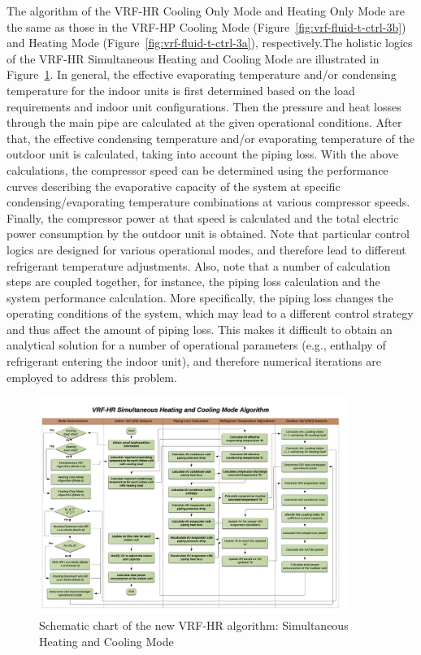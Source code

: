The algorithm of the VRF-HR Cooling Only Mode and Heating Only Mode are the same as those in the VRF-HP Cooling Mode (Figure~\ref{fig:vrf-fluid-t-ctrl-3b}) and Heating Mode (Figure~\ref{fig:vrf-fluid-t-ctrl-3a}), respectively.The holistic logics of the VRF-HR Simultaneous Heating and Cooling Mode are illustrated in Figure~\ref{fig:VRF-HR-AlgorithmOverview-Mode2-5}. In general, the effective evaporating temperature and/or condensing temperature for the indoor units is first determined based on the load requirements and indoor unit configurations. Then the pressure and heat losses through the main pipe are calculated at the given operational conditions. After that, the effective condensing temperature and/or evaporating temperature of the outdoor unit is calculated, taking into account the piping loss. With the above calculations, the compressor speed can be determined using the performance curves describing the evaporative capacity of the system at specific condensing/evaporating temperature combinations at various compressor speeds. Finally, the compressor power at that speed is calculated and the total electric power consumption by the outdoor unit is obtained. Note that particular control logics are designed for various operational modes, and therefore lead to different refrigerant temperature adjustments. Also, note that a number of calculation steps are coupled together, for instance, the piping loss calculation and the system performance calculation. More specifically, the piping loss changes the operating conditions of the system, which may lead to a different control strategy and thus affect the amount of piping loss. This makes it difficult to obtain an analytical solution for a number of operational parameters (e.g., enthalpy of refrigerant entering the indoor unit), and therefore numerical iterations are employed to address this problem.

\begin{figure}[hbtp] %
\centering
\includegraphics[width=0.9\textwidth, height=0.9\textheight, keepaspectratio=true]{media/VRF-HR-AlgorithmOverview-Mode2-5.png}
\caption{Schematic chart of the new VRF-HR algorithm: Simultaneous Heating and Cooling Mode \label{fig:VRF-HR-AlgorithmOverview-Mode2-5}}
\end{figure}

